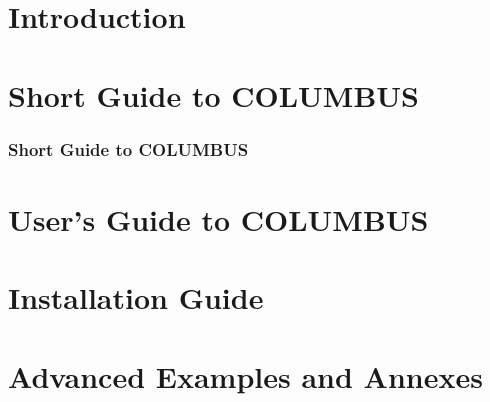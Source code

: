 \documentclass[a4paper,11pt]{book}
\begin{document}
%
%
\part{Introduction}

%
\part{Short Guide to COLUMBUS}
\section{Short Guide to COLUMBUS}
%
%
\part{User's Guide to COLUMBUS}

%
\part{Installation Guide}
%
%
\part{Advanced Examples and Annexes}
%
%
%
\backmatter



\end{document}
